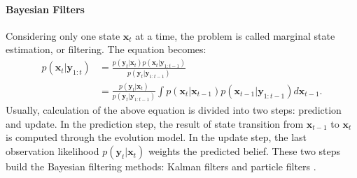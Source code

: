 \paragraph{Bayesian Filters}
\label{sec:bayesfilter}
Considering only one state $\boldsymbol{x}_{t}$ at a time, the problem is called marginal state estimation, or filtering. The equation becomes:
\begin{equation}
    \label{eq:bayesfilter}
    \begin{split}
        p(\boldsymbol{x}_{t}|\boldsymbol{y}_{1:t})&=\frac{p(\boldsymbol{y}_t|\boldsymbol{x}_t)p(\boldsymbol{x}_{t}|\boldsymbol{y}_{1:t-1})}{p(\boldsymbol{y}_t|\boldsymbol{y}_{1:t-1})}\\
        &=\frac{p(\boldsymbol{y}_t|\boldsymbol{x}_t)}{p(\boldsymbol{y}_t|\boldsymbol{y}_{1:t-1})}\int p(\boldsymbol{x}_{t}|\boldsymbol{x}_{t-1})p(\boldsymbol{x}_{t-1}|\boldsymbol{y}_{1:t-1})d\boldsymbol{x}_{t-1}.
    \end{split}
\end{equation}
Usually, calculation of the above equation is divided into two steps: prediction and update. In the prediction step, the result of state transition from $\boldsymbol{x}_{t-1}$ to $\boldsymbol{x}_t$ is computed through the evolution model. In the update step, the last observation likelihood $p(\boldsymbol{y}_t|\boldsymbol{x}_t)$ weights the predicted belief. These two steps build the Bayesian filtering methods: Kalman filters and particle filters \citep{chen_bayesian_2003}.

